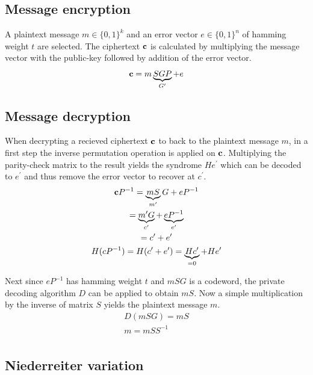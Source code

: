 \documentclass[11pt,
  oneside,openany,    %
]{scrreprt}
\begin{document}
\subsection{Message encryption} 
A plaintext message $m \in \{0,1\}^k$ and an error vector $e \in \{0,1\}^n$ of hamming weight $t$ are selected. The ciphertext $\bold{c}$ is calculated by multiplying the message vector with the public-key followed by addition of the error vector.
\begin{equation*}
\bold{c} = m \underbrace{SGP}_{G^{\prime}} + e\\
\end{equation*}

\subsection{Message decryption}
When decrypting a recieved ciphertext $\bold{c}$ to back to the plaintext message $m$, in a first step the inverse permutation operation is applied on $\bold{c}$. Multiplying the parity-check matrix to the result yields the syndrome $He^{\prime}$ which can be decoded to $e^{\prime}$ and thus remove the error vector to recover at $c^{\prime}$. 
\begin{gather*}
\bold{c} P^{-1} = \underbrace{mS}_{m^{\prime}}G + e P^{-1}\\
= \underbrace{m^{\prime} G}_{c^{\prime}} + \underbrace{e P^{-1}}_{e^{\prime}}\\
= c^{\prime} + e^{\prime}\\
H(cP^{-1}) = H(c^{\prime} + e^{\prime}) = \underbrace{Hc^{\prime}}_{= 0} + He^{\prime}\\
\end{gather*}

Next since $e P^{-1}$ has hamming weight $t$ and $mSG$ is a codeword, the private decoding algorithm $D$ can be applied to obtain $mS$. Now a simple multiplication by the inverse of matrix $S$ yields the plaintext message $m$.
\begin{gather*}
D(mSG) = mS \\
m = mS S^{-1} \\
\end{gather*}


\subsection{Niederreiter variation}
\end{document}

